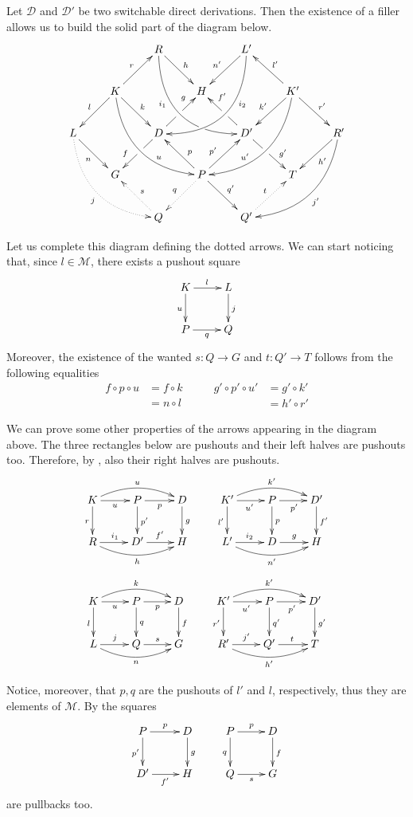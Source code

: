 \documentclass[a4paper,UKenglish,cleveref,pdftex, thm-restate,numberwithinsect]{lipics}
\newcommand{\dder}[1]{\mathscr{#1}}
\begin{document}
\begin{remark}\label{rem:deco} Let $\dder{D}$ and $\dder{D'}$ be two switchable direct derivations. Then the existence of a filler allows us to build the solid part of the diagram below.
	\[\xymatrix{&&R \ar@/_1cm/[ddrr]_(.35){i_1}|(.7)\hole  \ar[dr]^{h}&& L'\ar@/^1cm/[ddll]^(.35){i_2}  \ar[dl]_{n'}\\&K\ar[dr]^{k}\ar[dl]_{l} \ar@/_.8cm/[ddrr]^(.65){u}\ar[ur]^{r}&& H && K' \ar@/^.8cm/[ddll]_(.65){u'}\ar[dl]_{k'}\ar[lu]_{l'} \ar[dr]^{r'}\\L \ar[dr]_{n} \ar@{.>}@/_.8cm/[ddrr]_{j}&& D \ar[dl]|(.42)\hole_(.64){f}\ar[ur]|(.48)\hole^(.7){g}&&D' \ar[dr]|(.42)\hole^(.65){g'} \ar[ul]|(.48)\hole_(.7){f'}&&R'\ar@/^.8cm/[ddll]^{j'}\ar[dl]^{h'}\\&G &&P\ar[dr]^{q'} \ar@{.>}[dl]_{q}\ar[ur]^(.4){p'}\ar[ul]_(.4){p}&&T\\&&Q \ar@{.>}[ul]_{s} &&Q'\ar@{.>}[ur]^{t}}\]
	
	Let us complete this diagram defining the dotted arrows. We can start noticing that, since $l\in \mathcal{M}$, there exists a pushout square 
	\[\xymatrix{K \ar[r]^{l} \ar[d]_{u}& L\ar[d]^{j} \\ P \ar[r]_{q} & Q}\]
	Moreover, the existence of the wanted $s\colon Q\to G$ and $t\colon Q'\to T$ follows from the following equalities
	\[\begin{split}
		f\circ p \circ u &= f\circ k \\&= n\circ l
	\end{split} \qquad \begin{split}
		g'\circ p'\circ u' &= g'\circ k'\\&=h'\circ r'
	\end{split}\]
	
	We can prove some other properties of the arrows appearing in the diagram above. The three rectangles below are pushouts and their left halves are pushouts too. Therefore, by , also their right halves are pushouts.
	\[\xymatrix{K \ar@/^.4cm/[rr]^{u}\ar[d]_{r}\ar[r]_{u} &P\ar[d]^{p'} \ar[r]_{p} & D \ar[d]^{g}&K' \ar@/^.4cm/[rr]^{k'}\ar[d]_{l'}\ar[r]_{u'} &P\ar[d]^{p} \ar[r]_{p'} & D' \ar[d]^{f'}\\  R \ar@/_.4cm/[rr]_{h} \ar[r]^{i_1}&D' \ar[r]^{f'} & H&L' \ar@/_.4cm/[rr]_{n'} \ar[r]^{i_2}&D \ar[r]^{g} & H}\]
	\[ \xymatrix{K \ar@/^.4cm/[rr]^{k}\ar[d]_{l}\ar[r]_{u} &P\ar[d]^{q} \ar[r]_{p} & D \ar[d]^{f}&K' \ar@/^.4cm/[rr]^{k'}\ar[d]_{r'}\ar[r]_{u'} &P\ar[d]^{q'} \ar[r]_{p'} & D' \ar[d]^{g'}\\ L \ar@/_.4cm/[rr]_{n} \ar[r]^{j}&Q \ar[r]^{s} & G&R' \ar@/_.4cm/[rr]_{h'} \ar[r]^{j'}&Q' \ar[r]^{t} & T}\]
	
	Notice, moreover, that $p, q$ are the pushouts of $l'$ and $l$, respectively, thus they  are elements of $\mathcal{M}$. By  the squares
	\[\xymatrix{P\ar[r]^{p} \ar[d]_{p'} & D \ar[d]^{g}& P \ar[r]^{p} \ar[d]_{q} &D\ar[d]^{f}\\ D' \ar[r]_{f'} & H & Q \ar[r]_{s}& G}\]
	are pullbacks too.
\end{remark}
\end{document}
